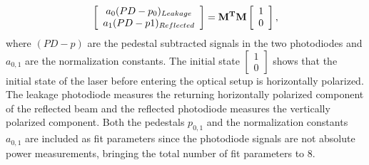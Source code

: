 \begin{equation}
\left[\begin{array}{c}a_0(PD-p_0)_{Leakage}\\a_1(PD-p1)_{Reflected}\end{array}\right]={\bf M^T M}\left[\begin{array}{c}1\\0\end{array}\right],
\label{eq:entrance_model}
\end{equation}
where $(PD-p)$ are the pedestal subtracted signals in the two photodiodes and $a_{0,1}$ are the normalization constants. The initial state $\left[\begin{array}{c}1\\0\end{array}\right]$ shows that the initial state of the laser before entering the optical setup is horizontally polarized. The leakage photodiode measures the returning horizontally polarized component of the reflected beam and the reflected photodiode measures the vertically polarized component. Both the pedestals $p_{0,1}$ and the normalization constants $a_{0,1}$ are included as fit parameters since the photodiode signals are not absolute power measurements, bringing the total number of fit parameters to 8.

